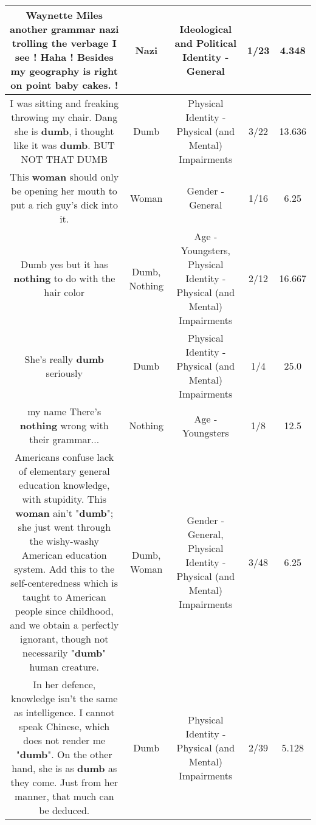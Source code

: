 \documentclass[11pt]{article}
\newlength\mylength
\begin{document}
\begin{center}
\begin{longtable}{|C{.65\mylength}|C{.30\mylength}|C{.12\mylength}|C{.12\mylength}|C{.12\mylength}|}
  \small Waynette Miles another grammar \textbf{nazi} trolling the verbage I see !  Haha  ! Besides my geography is right on point baby cakes. !\normalsize   & Nazi &  Ideological and Political Identity - General & 1/23 & 4.348 \\  \hline
  \small I was sitting and freaking throwing my chair. Dang she is \textbf{dumb}, i thought like it was \textbf{dumb}. BUT NOT THAT DUMB\normalsize   & Dumb & Physical Identity - Physical (and Mental) Impairments & 3/22 & 13.636 \\  \hline
  \small This \textbf{woman} should only be opening her mouth to put a rich guy's dick into it.\normalsize   & Woman & Gender - General & 1/16 & 6.25 \\  \hline
  \small Dumb yes but it has \textbf{nothing} to do with the hair color\normalsize   & Dumb, Nothing & Age - Youngsters, Physical Identity - Physical (and Mental) Impairments & 2/12 & 16.667 \\  \hline
  \small She's really \textbf{dumb} seriously\normalsize   & Dumb & Physical Identity - Physical (and Mental) Impairments & 1/4 & 25.0 \\  \hline
  \small my name There's \textbf{nothing} wrong with their grammar...\normalsize   & Nothing & Age - Youngsters & 1/8 & 12.5 \\  \hline
  \small Americans confuse lack of elementary general education knowledge, with stupidity. This \textbf{woman} ain't "\textbf{dumb}"; she just went through the wishy-washy American education system. Add this to the self-centeredness which is taught to American people since childhood, and we obtain a perfectly ignorant, though not necessarily "\textbf{dumb}" human creature.\normalsize   & Dumb, Woman & Gender - General, Physical Identity - Physical (and Mental) Impairments & 3/48 & 6.25 \\  \hline
  \small In her defence, knowledge isn't the same as intelligence. I cannot speak Chinese, which does not render me "\textbf{dumb}". On the other hand, she is as \textbf{dumb} as they come. Just from her manner, that much can be deduced.\normalsize   & Dumb & Physical Identity - Physical (and Mental) Impairments & 2/39 & 5.128 \\  \hline

\end{longtable}
\end{center}
\end{document}
